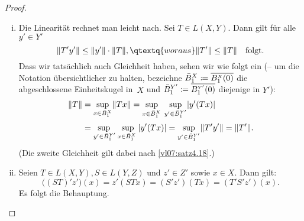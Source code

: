 \begin{proof}\hfill
    \begin{enumerate}[(i)]
        \item
            Die Linearität rechnet man leicht nach. Sei $T\in L(X,Y)$. Dann gilt
            für alle $y'\in Y'$
            \[ \norm{T'y'} \leq \norm{y'} \cdot \norm{T}, \qtextq{woraus} 
                \norm{T'} \leq \norm{T} \quad\text{folgt}
            . \]
            Dass wir tatsächlich auch Gleichheit haben, sehen wir wie folgt ein
            (-- um die Notation übersichtlicher zu halten, bezeichne $\bar B^X_1
            \coloneqq \overline{B^{\scriptscriptstyle X}_1(0)}$ die
            abgeschlossene Einheitskugel in~$X$ und $\bar B^{Y'}_1 \coloneqq
            \overline{B^{\scriptscriptstyle Y'}_1(0)}$ diejenige in $Y'$):
            \begin{align*}
                \norm{T} 
                &= \sup_{x\in \bar B^X_1} \norm{Tx}
                 = \adjustlimits
                   \sup_{x\in \bar B^X_1\;} 
                    \sup_{y'\in \bar B^{Y'}_1} \abs{y'(Tx)}
                \\[2pt]
                &= \adjustlimits
                   \sup_{y'\in \bar B^{Y'}_1} 
                    \sup_{x\in \bar B^X_1\;} \abs{y'(Tx)}
                 = \sup_{y'\in \bar B^{Y'}_1} \norm{T'y'}
                 = \norm{T'}
            . \end{align*}
            (Die zweite Gleichheit gilt dabei nach \cref{vl07:satz4.18}.)
        
        \item
            Seien $T\in L(X,Y), S\in L(Y,Z)$ und $z'\in Z'$ sowie $x\in X$. Dann
            gilt:
            \[ \bigl( (ST)' z' \bigr)(x) = z'(STx) 
                = (S'z')(Tx) = (T'S'z')(x)  
            . \]
            Es folgt die Behauptung.
    \end{enumerate}
\end{proof}
        
